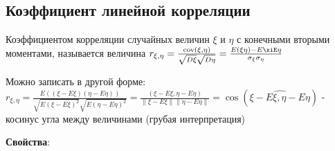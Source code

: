 \documentclass[12pt]{article}
\begin{document}
\subsection{Коэффициент линейной корреляции}

\Def Коэффициентом корреляции случайных величин $\xi$ и $\eta$ с конечными вторыми моментами,
называется величина $r_{\xi,\eta} = \frac{\mathrm{cov(\xi, \eta)}}{\sqrt{D\xi} \sqrt{D\eta}} = \frac{E(\xi\eta) - E\xiE\eta}{\sigma_\xi \sigma_\eta}$

Можно записать в другой форме: $r_{\xi,\eta} = \frac{E((\xi - E\xi)(\eta - E\eta))}{\sqrt{E(\xi - E\xi)^2}\sqrt{E(\eta - E\eta)^2}} = 
\frac{(\xi - E\xi, \eta - E\eta)}{\|\xi - E\xi\|\|\eta - E\eta\|} = \cos(\widehat{\xi - E\xi, \eta - E\eta})$ - косинус угла между величинами (грубая интерпретация)

\mediumvspace

\textbf{Свойства}:
\end{document}
